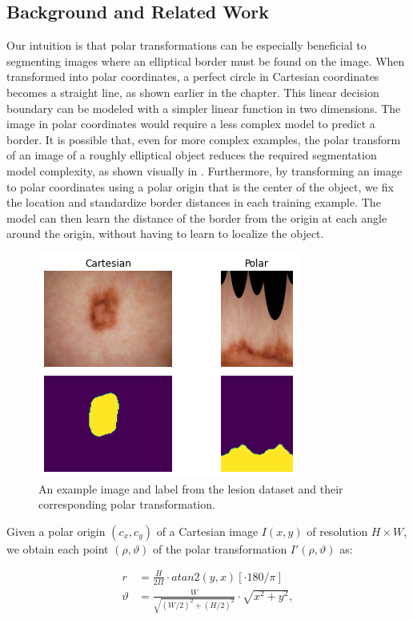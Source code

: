 \subsection{Background and Related Work}

Our intuition is that polar transformations can be especially beneficial to segmenting images where an 
elliptical border must be found on the image. When transformed into 
polar coordinates, a perfect circle in Cartesian coordinates becomes a straight line, as shown earlier in the chapter. This linear decision boundary can be modeled with a simpler linear function 
in two dimensions. The image in polar coordinates would require a less complex model to predict a 
border. It is possible that, even for more complex examples, the polar transform of an image of a roughly 
elliptical object reduces the required segmentation model complexity, as shown visually in 
. Furthermore, by transforming an image to polar coordinates using a polar origin 
that is the center of the object, we fix the location and standardize border distances in each training 
example. The model can then learn the distance of the border from the origin at each angle around the 
origin, without having to learn to localize the object.

	\begin{figure}[h]
		\centering
		\includegraphics[width=0.4\linewidth]{images/4/to_polar}
		\caption{An example image and label from the lesion dataset and their corresponding polar transformation.}
		\label{fig:polar-lesion}
	\end{figure}

Given a polar origin $(c_x, c_y)$ of a Cartesian image $I(x, y)$ of resolution $H \times W$, we obtain each point $(\rho, \vartheta)$ of the polar transformation $I'(\rho, \vartheta)$ as:

  \begin{equation}
    \begin{aligned}
      r &= \frac{H}{2 \Pi} \cdot atan2(y, x) [ \cdot 180 / \pi ] \\
      \vartheta &= \frac{W}{\sqrt{(W / 2)^2 + (H / 2)^2}} \cdot \sqrt{x^2 + y^2},
    \end{aligned}
    \label{eq:polar-transform}
  \end{equation}
  
